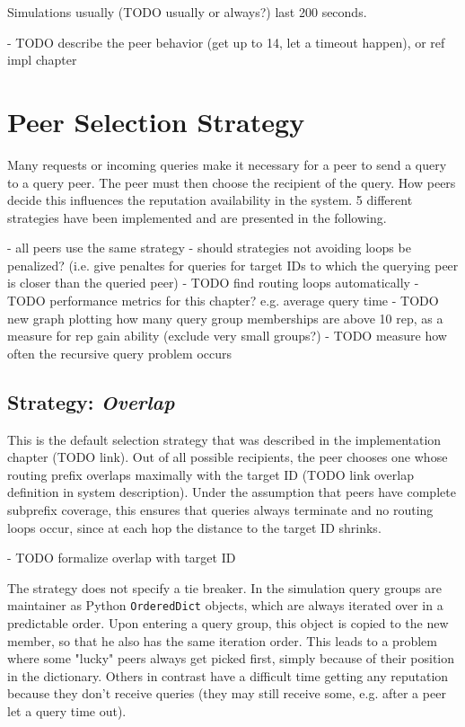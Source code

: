 Simulations usually (TODO usually or always?) last 200 seconds.

- TODO describe the peer behavior (get up to 14, let a timeout happen), or ref
  impl chapter

\section{Peer Selection Strategy}
\label{sec:selection}
Many requests or incoming queries make it necessary for a peer to send a query
to a query peer. The peer must then choose the recipient of the query. How peers
decide this influences the reputation availability in the system. 5 different
strategies have been implemented and are presented in the following.

- all peers use the same strategy
- should strategies not avoiding loops be penalized? (i.e. give penaltes for
  queries for target IDs to which the querying peer is closer than the queried
  peer)
- TODO find routing loops automatically
- TODO performance metrics for this chapter? e.g. average query time
- TODO new graph plotting how many query group memberships are above 10 rep, as
  a measure for rep gain ability (exclude very small groups?)
- TODO measure how often the recursive query problem occurs

\subsection{Strategy: \emph{Overlap}}
\label{sec:rep_avail_selection_overlap}
This is the default selection strategy that was described in the implementation
chapter (TODO link). Out of all possible recipients, the peer chooses one whose
routing prefix overlaps maximally with the target ID (TODO link overlap
definition in system description). Under the assumption that peers have complete
subprefix coverage, this ensures that queries always terminate and no routing
loops occur, since at each hop the distance to the target ID shrinks.

- TODO formalize overlap with target ID

The strategy does not specify a tie breaker. In the simulation query groups are
maintainer as Python \texttt{OrderedDict} objects, which are always iterated
over in a predictable order. Upon entering a query group, this object is copied
to the new member, so that he also has the same iteration order. This leads to a
problem where some "lucky" peers always get picked first, simply because of
their position in the dictionary. Others in contrast have a difficult time
getting any reputation because they don't receive queries (they may still
receive some, e.g. after a peer let a query time out).

